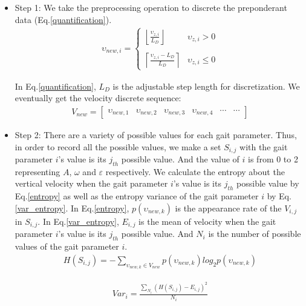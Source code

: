 \begin{itemize}
	\item Step 1: We take the preprocessing operation to discrete the preponderant data (Eq.\ref{quantification}).
	\begin{eqnarray}\label{quantification}
	\upsilon_{new,i}=\left\{
	\begin{array}{lr}
	\left \lfloor \frac{\upsilon_{z,i}}{L_{D}} \right \rfloor&\upsilon_{z,i}> 0\\
	\\
	\left \lceil \frac{\upsilon_{z,i}-L_{D}}{L_{D}} \right \rceil&\upsilon_{z,i}\leq 0
	\end{array}
	\right.
	\end{eqnarray}
	
	In Eq.\ref{quantification}, $L_{D}$ is the adjustable step length for discretization. We eventually get the velocity discrete sequence:
	\begin{eqnarray}\label{newMember}
	V_{new}=\begin{bmatrix}
	\upsilon_{new,1} & \upsilon_{new,2} & \upsilon_{new,3} & \upsilon_{new,4} & \cdots & \cdots
	\end{bmatrix}
	\end{eqnarray}
	
	\item Step 2: There are a variety of possible values for each gait parameter. Thus, in order to record all the possible values, we make a set $S_{i,j}$ with the gait parameter $i$'s value is its $j_{th}$ possible value. And the value of $i$ is from 0 to 2 representing $A$, $\omega$ and $\varepsilon$ respectively. We calculate the entropy about the vertical velocity when the gait parameter $i$'s value is its $j_{th}$ possible value by Eq.\ref{entropy} as well as the entropy variance of the gait parameter $i$ by Eq.\ref{var_entropy}. In Eq.\ref{entropy}, $p(\upsilon_{new,k})$ is the appearance rate of the $V_{i,j}$ in $S_{i,j}$. In Eq.\ref{var_entropy}, $E_{i,j}$ is the mean of velocity when the gait parameter $i$'s value is its $j_{th}$ possible value. And $N_{i}$ is the number of possible values of the gait parameter $i$.
	\begin{eqnarray}\label{entropy}
	H(S_{i,j})=-\sum _{\upsilon_{new,k}\in V_{new}}p(\upsilon_{new,k})log_{2}p(\upsilon_{new,k})
	\end{eqnarray}
	
	\begin{eqnarray}\label{var_entropy}
	Var_{i}=\frac{\sum _{N_{i}}(H(S_{i,j})-E_{i,j})^{2}}{N_{i}}
	\end{eqnarray}
	

\end{itemize}
